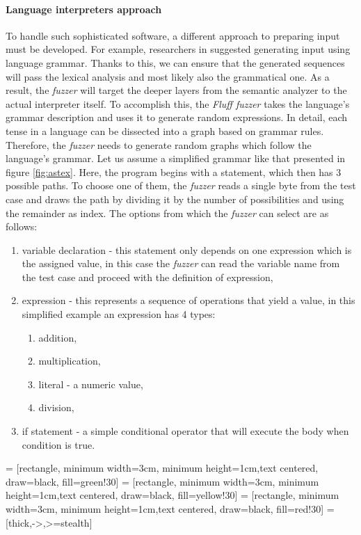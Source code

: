 \paragraph{Language interpreters approach}
To handle such sophisticated software, a different approach to preparing input must be developed. For example, researchers in \cite{dominiak2019efficient} suggested generating input using language grammar. Thanks to this, we can ensure that the generated sequences will pass the lexical analysis and most likely also the grammatical one. As a result, the \textit{fuzzer} will target the deeper layers from the semantic analyzer to the actual interpreter itself. To accomplish this, the \textit{Fluff fuzzer} takes the language's grammar description and uses it to generate random expressions. In detail, each tense in a language can be dissected into a graph based on grammar rules. Therefore, the \textit{fuzzer} needs to generate random graphs which follow the language's grammar. Let us assume a simplified grammar like that presented in figure \ref{fig:astex}. Here, the program begins with a statement, which then has 3 possible paths. To choose one of them, the \textit{fuzzer} reads a single byte from the test case and draws the path by dividing it by the number of possibilities and using the remainder as index. The options from which the \textit{fuzzer} can select are as follows:
\begin{enumerate}
    \item variable declaration - this statement only depends on one expression which is the assigned value, in this case the \textit{fuzzer} can read the variable name from the test case and proceed with the definition of expression,
    \item expression - this represents a sequence of operations that yield a value, in this simplified example an expression has 4 types:
    \begin{enumerate}
        \item addition,
        \item multiplication,
        \item literal - a numeric value,
        \item division,
    \end{enumerate}
    \item if statement - a simple conditional operator that will execute the body when condition is true.
\end{enumerate}

 = [rectangle, minimum width=3cm, minimum height=1cm,text centered, draw=black, fill=green!30]
 = [rectangle, minimum width=3cm, minimum height=1cm,text centered, draw=black, fill=yellow!30]
 = [rectangle, minimum width=3cm, minimum height=1cm,text centered, draw=black, fill=red!30]
 = [thick,->,>=stealth]

